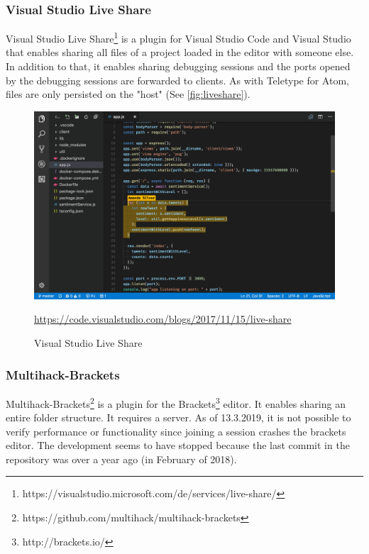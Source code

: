 \subsubsection{Visual Studio Live Share}
Visual Studio Live Share\footnote{https://visualstudio.microsoft.com/de/services/live-share/}  is a plugin for Visual Studio Code and Visual Studio that enables sharing all files of a project loaded in the editor with someone else. In addition to that, it enables sharing debugging sessions and the ports opened by the debugging sessions are forwarded to clients. As with Teletype for Atom, files are only persisted on the "host" (See \autoref{fig:liveshare}).
\begin{figure}[hb]
    \centering
    \includegraphics[width=1\linewidth]{figures/screenshots/vscodeliveshare.png}
	\caption{Visual Studio Live Share}
	\href{https://code.visualstudio.com/blogs/2017/11/15/live-share}{https://code.visualstudio.com/blogs/2017/11/15/live-share}
    \label{fig:liveshare}
\end{figure}
\subsubsection{Multihack-Brackets}
Multihack-Brackets\footnote{https://github.com/multihack/multihack-brackets} is a plugin for the Brackets\footnote{http://brackets.io/} editor. It enables sharing an entire folder structure. It requires a server. As of 13.3.2019, it is not possible to verify performance or functionality since joining a session crashes the brackets editor. The development seems to have stopped because the last commit in the repository was over a year ago (in February of 2018).
